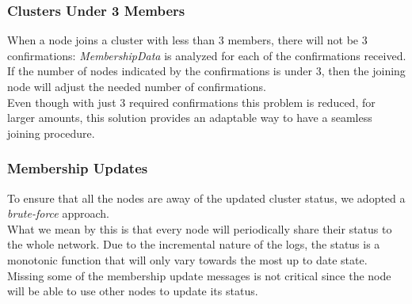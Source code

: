 \documentclass{article}
\begin{document}
\begin{multicols}{2}
    \subsubsection{Clusters Under 3 Members}
    When a node joins a cluster with less than 3 members, there will not be 3 confirmations: \textit{MembershipData} is analyzed for each of the confirmations received. \\
    
    If the number of nodes indicated by the confirmations is under 3, then the joining node will adjust the needed number of confirmations. \\
    
    Even though with just 3 required confirmations this problem is reduced, for larger amounts, this solution provides an adaptable way to have a seamless joining procedure.
    
    \subsubsection {Membership Updates}
    To ensure that all the nodes are away of the updated cluster status, we adopted a \textit{brute-force} approach. \\
    
    What we mean by this is that every node will periodically share their status to the whole network. Due to the incremental nature of the logs, the status is a monotonic function that will only vary towards the most up to date state. \\
    
    Missing some of the membership update messages is not critical since the node will be able to use other nodes to update its status.


\end{multicols}
\end{document}
